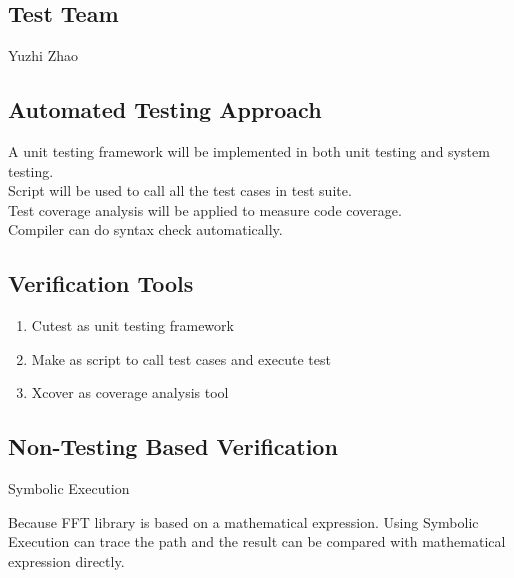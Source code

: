 \documentclass[12pt, titlepage]{article}
\begin{document}
\subsection{Test Team}
Yuzhi Zhao

\subsection{Automated Testing Approach}
A unit testing framework will be implemented in both unit testing and system testing.\\
Script will be used to call all the test cases in test suite.\\
Test coverage analysis will be applied to measure code coverage.\\
Compiler can do syntax check automatically.

\subsection{Verification Tools}
\begin{enumerate}
\item {{\large Cutest} as unit testing framework} 
\item {{\large Make} as script to call test cases and execute test}
\item {{\large Xcover} as coverage analysis tool}
\end{enumerate}

		

\subsection{Non-Testing Based Verification}
{\large Symbolic Execution}

Because FFT library is based on a mathematical expression. Using Symbolic Execution can trace the path and the result can be compared with mathematical expression directly.


\end{document}
